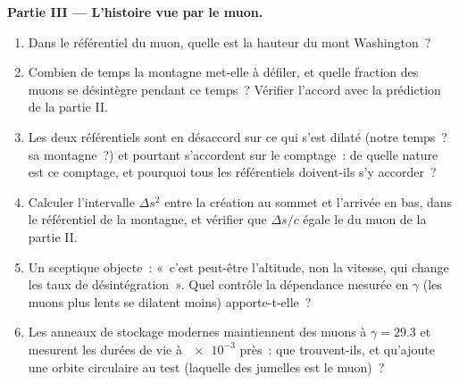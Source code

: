 \begin{problem}
\medskip\noindent\textbf{Partie III --- L'histoire vue par le muon.}
\begin{enumerate}[resume]
  \item Dans le référentiel du muon, quelle est la hauteur du mont
        Washington~?
  \item Combien de temps la montagne met-elle à défiler, et quelle
        fraction des muons se désintègre pendant ce temps~? Vérifier
        l'accord avec la prédiction de la partie II.
  \item Les deux référentiels sont en désaccord sur ce qui s'est
        dilaté (notre temps~? sa montagne~?) et pourtant s'accordent
        sur le comptage~: de quelle nature est ce comptage, et
        pourquoi tous les référentiels doivent-ils s'y accorder~?
  \item Calculer l'intervalle $\Delta s^2$ entre la création au sommet
        et l'arrivée en bas, dans le référentiel de la montagne, et
        vérifier que $\Delta s/c$ égale le  du muon de la
        partie II.
  \item Un sceptique objecte~: «~c'est peut-être l'altitude, non la
        vitesse, qui change les taux de désintégration~». Quel contrôle
        la dépendance mesurée en $\gamma$ (les muons plus lents se
        dilatent moins) apporte-t-elle~?
  \item Les anneaux de stockage modernes maintiennent des muons à
        $\gamma = 29.3$ et mesurent les durées de vie à $\num{e-3}$
        près~: que trouvent-ils, et qu'ajoute une orbite circulaire au
        test (laquelle des jumelles est le muon)~?
\end{enumerate}


\end{problem}
